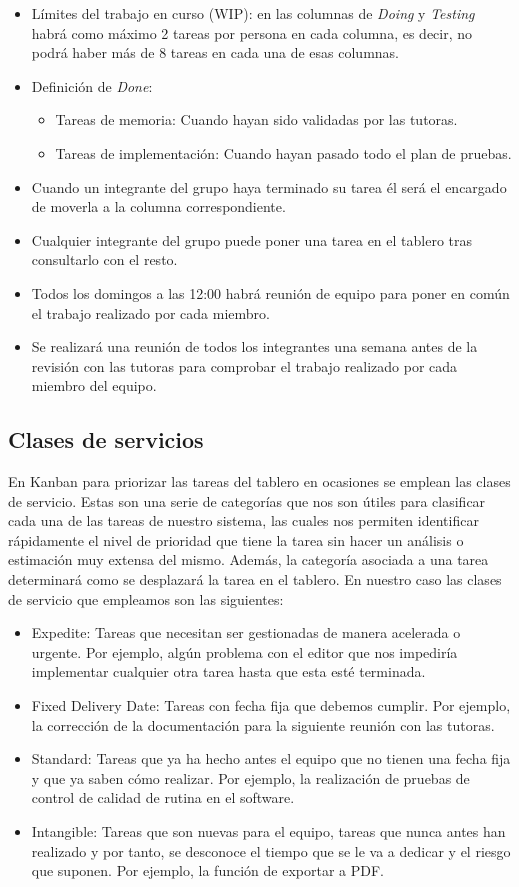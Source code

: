 \begin{itemize}
  \item Límites del trabajo en curso (WIP): en las columnas de \textit{Doing} y \textit{Testing} habrá como máximo 2 tareas por persona en cada columna, es decir, no podrá haber más de 8 tareas en cada una de esas columnas.
  \item Definición de \textit{Done}:
        \begin{itemize}
          \item Tareas de memoria: Cuando hayan sido validadas por las tutoras.
          \item Tareas de implementación: Cuando hayan pasado todo el plan de pruebas.
        \end{itemize}
  \item Cuando un integrante del grupo haya terminado su tarea él será el encargado de moverla a la columna correspondiente.
  \item Cualquier integrante del grupo puede poner una tarea en el tablero tras consultarlo con el resto.
  \item Todos los domingos a las 12:00 habrá reunión de equipo para poner en común el trabajo realizado por cada miembro.
  \item Se realizará una reunión de todos los integrantes una semana antes de la revisión con las tutoras para comprobar el trabajo realizado por cada miembro del equipo.
\end{itemize}

\subsection{Clases de servicios}
\label{claseDeServicio}
En Kanban para priorizar las tareas del tablero en ocasiones se emplean las clases de servicio. Estas son una serie de categorías que nos son útiles para clasificar cada una de las tareas de nuestro sistema, las cuales nos permiten identificar rápidamente el nivel de prioridad que tiene la tarea sin hacer un análisis o estimación muy extensa del mismo. Además, la categoría asociada a una tarea determinará como se desplazará la tarea en el tablero. En nuestro caso las clases de servicio que empleamos son las siguientes:
\begin{itemize}
  \item Expedite: Tareas que necesitan ser gestionadas de manera acelerada o urgente. Por ejemplo, algún problema con el editor que nos impediría implementar cualquier otra tarea hasta que esta esté terminada.
  \item Fixed Delivery Date: Tareas con fecha fija que debemos cumplir. Por ejemplo, la corrección de la documentación para la siguiente reunión con las tutoras.
  \item Standard: Tareas que ya ha hecho antes el equipo que no tienen una fecha fija y que ya saben cómo realizar. Por ejemplo, la realización de pruebas de control de calidad de rutina en el software.
  \item Intangible: Tareas que son nuevas para el equipo, tareas que nunca antes han realizado y por tanto, se desconoce el tiempo que se le va a dedicar y el riesgo que suponen. Por ejemplo, la función de exportar a PDF.
\end{itemize}

